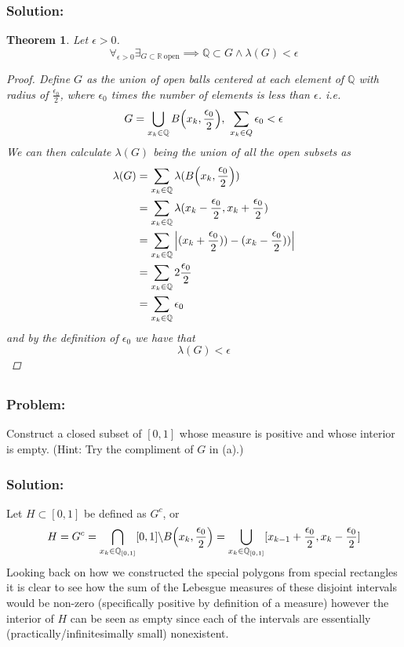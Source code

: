 \documentclass[]{article}
\newcommand{\R}{\mathbb{R}}
\newcommand{\Q}{\mathbb{Q}}
\newtheorem{theorem}{Theorem}
\begin{document}
\subsubsection*{Solution:}
\begin{theorem}
    Let $\epsilon > 0$. \[
        \forall_{\epsilon>0} \exists_{G \subset \R \ \text{open}} 
        \implies \Q \subset G \land \lambda(G) < \epsilon
    \]
    \begin{proof}
        Define $G$ as the union of open balls centered at each element of $\Q$ with radius of $\frac{\epsilon_0}{2}$, where $\epsilon_0$ times the number of elements is less than $\epsilon$. 
        i.e.\[
            G = \bigcup_{x_k \in \Q} B\qty(x_k, \frac{\epsilon_0}{2}), \ \sum_{x_k \in Q} \epsilon_0 < \epsilon
        \] We can then calculate $\lambda(G)$ being the union of all the open subsets as \begin{align*}
            \lambda(G) 
                &= \sum_{x_k \in \Q} \lambda(B\qty(x_k, \frac{\epsilon_0}{2}))\\
                &= \sum_{x_k \in \Q} \lambda{(x_k - \frac{\epsilon_0}{2}, x_k + \frac{\epsilon_0}{2})}\\
                &= \sum_{x_k \in \Q} \abs{(x_k + \frac{\epsilon_0}{2})) - (x_k - \frac{\epsilon_0}{2}))}\\
                &= \sum_{x_k \in \Q} 2 \frac{\epsilon_0}{2} \\
                &= \sum_{x_k \in \Q} \epsilon_0
        \end{align*}
        and by the definition of $\epsilon_0$ we have that \[
            \lambda(G) < \epsilon
        \]
    \end{proof}
\end{theorem}

\subsection{}
\subsubsection*{Problem:}
Construct a closed subset of $[0,1]$ whose measure is positive and whose interior is empty. 
(Hint: Try the compliment of $G$ in (a).)
\subsubsection*{Solution:}

Let $H \subset [0,1]$ be defined as $G^c$, or \[
    H 
        = G^c 
        = \bigcap_{x_k \in \Q_{[0,1]}} [0,1] \backslash B\qty(x_k, \frac{\epsilon_0}{2})
        = \bigcup_{x_k \in \Q_{[0,1]}} [x_{k-1} + \frac{\epsilon_0}{2}, x_k - \frac{\epsilon_0}{2}]
\]
Looking back on how we constructed the special polygons from special rectangles it is clear to see how the sum of the Lebesgue measures of these disjoint intervals would be non-zero (specifically positive by definition of a measure) however the interior of $H$ can be seen as empty since each of the intervals are essentially (practically/infinitesimally small) nonexistent.
\end{document}
